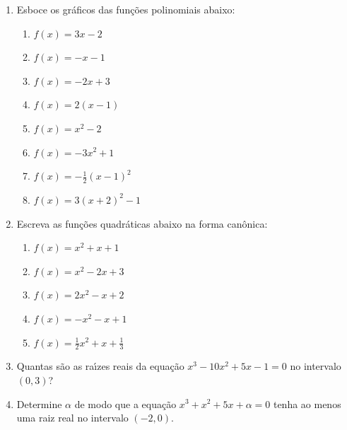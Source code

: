 \documentclass[a4paper,5pt]{amsbook}
\newcommand{\ds}{\displaystyle}
\begin{document}
\vspace{1cm}
\begin{enumerate}
	\vspace{0.5cm}
    \item Esboce os gr\'aficos das fun\c{c}\~oes polinomiais abaixo:
        \begin{enumerate}
                \vspace{0.3cm}
            \item $f(x)=3x-2$
                \vspace{0.3cm}
            \item $f(x)=-x-1$
                \vspace{0.3cm}
            \item $f(x)=-2x+3$
                \vspace{0.3cm}
            \item $f(x)=2(x-1)$
                \vspace{0.3cm}
            \item $f(x)=x^2-2$
                \vspace{0.3cm}
            \item $f(x)=-3x^2+1$
                \vspace{0.3cm}
            \item $\ds f(x)=-\frac{1}{2}{(x-1)}^2$
                \vspace{0.3cm}
            \item $f(x)=3{(x+2)}^2-1$
        \end{enumerate}

    \vspace{0.5cm}
    \item Escreva as fun\c{c}\~oes quadr\'aticas abaixo na forma can\^onica:
        \begin{enumerate}
            \vspace{0.3cm}
            \item $f(x)=x^2+x+1$
            \vspace{0.3cm}
            \item $f(x)=x^2-2x+3$
            \vspace{0.3cm}
            \item $f(x)=2x^2-x+2$
            \vspace{0.3cm}
            \item $f(x)=-x^2-x+1$
            \vspace{0.3cm}
            \item $\ds f(x)=\frac{1}{2}x^2+x+\frac{1}{3}$
        \end{enumerate}

    \vspace{0.5cm}
    \item Quantas s\~ao as ra\'{\i}zes reais da equa\c{c}\~ao $x^3-10x^2+5x-1=0$ no
        intervalo $(0, 3)$?

    \vspace{0.5cm}
    \item Determine $\alpha$ de modo que a equa\c{c}\~ao $x^3+x^2+5x+\alpha=0$ tenha
        ao menos uma raiz real no intervalo $(-2,0)$.
\end{enumerate}
\end{document}
